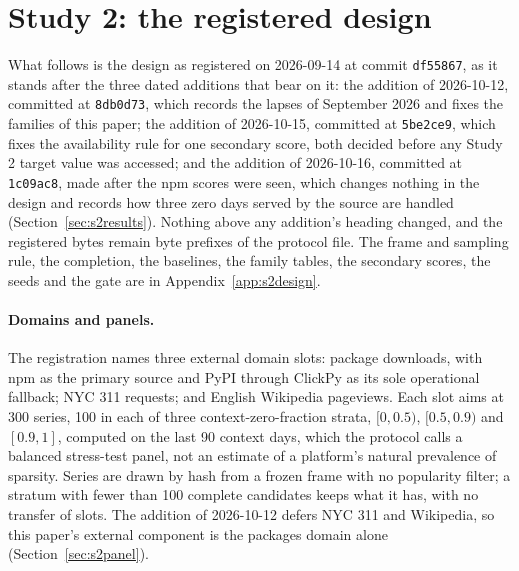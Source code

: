 \providecommand{\lm}{\texttt{local\_mean\_28}}
\providecommand{\aets}{\texttt{autoets\_weekly}}
\providecommand{\qs}{QScore9}
\providecommand{\hc}{\texttt{hurdle\_count\_28}}

\section{Study 2: the registered design}
\label{sec:s2design}

What follows is the design as registered on 2026-09-14 at commit \texttt{df55867}, as it stands after the three
dated additions that bear on it: the addition of 2026-10-12, committed at \texttt{8db0d73}, which
records the lapses of September 2026 and fixes the families of this paper; the addition of 2026-10-15,
committed at \texttt{5be2ce9}, which fixes the availability rule for one secondary score, both decided
before any Study 2 target value was accessed; and the addition of 2026-10-16, committed at \texttt{1c09ac8},
made after the npm scores were seen, which changes nothing in the design and records how three zero days
served by the source are handled (Section~\ref{sec:s2results}). Nothing above any addition's heading
changed, and the registered bytes remain byte prefixes of the protocol file. The frame and sampling rule,
the completion, the baselines, the family tables, the secondary scores, the seeds and the gate are in
Appendix~\ref{app:s2design}.

\paragraph{Domains and panels.} The registration names three external domain slots: package downloads,
with npm as the primary source and PyPI through ClickPy as its sole operational fallback; NYC 311 requests;
and English Wikipedia pageviews. Each slot aims at 300 series, 100 in each of three context-zero-fraction
strata, $[0, 0.5)$, $[0.5, 0.9)$ and $[0.9, 1]$, computed on the last 90 context days, which the protocol
calls a balanced stress-test panel, not an estimate of a platform's natural prevalence of sparsity. Series
are drawn by hash from a frozen frame with no popularity filter; a stratum with fewer than 100 complete
candidates keeps what it has, with no transfer of slots. The addition of 2026-10-12 defers NYC 311 and
Wikipedia, so this paper's external component is the packages domain alone (Section~\ref{sec:s2panel}).


